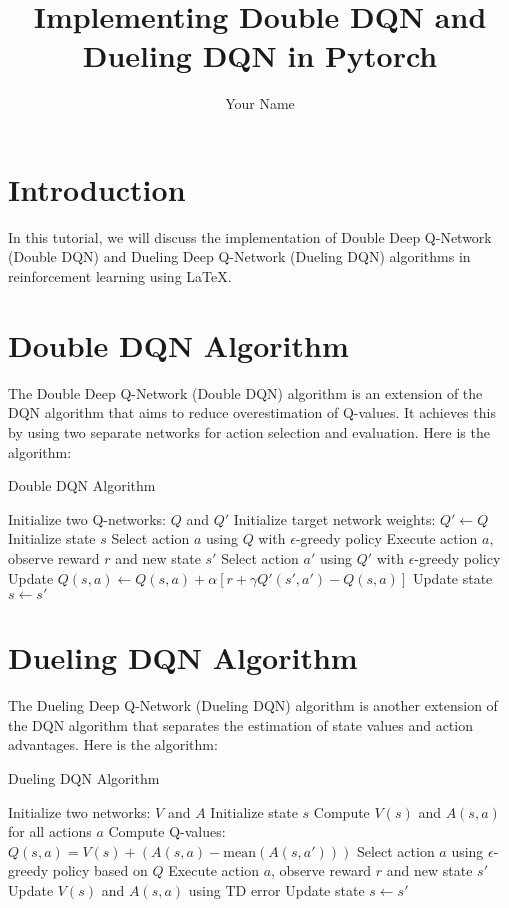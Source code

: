 \documentclass{article}
\title{Implementing Double DQN and Dueling DQN in Pytorch}
\author{Your Name}
\date{}
\begin{document}
\maketitle

\section{Introduction}
In this tutorial, we will discuss the implementation of Double Deep Q-Network (Double DQN) and Dueling Deep Q-Network (Dueling DQN) algorithms in reinforcement learning using LaTeX.

\section{Double DQN Algorithm}
The Double Deep Q-Network (Double DQN) algorithm is an extension of the DQN algorithm that aims to reduce overestimation of Q-values. It achieves this by using two separate networks for action selection and evaluation. Here is the algorithm:

\begin{algorithm}
\caption{Double DQN Algorithm}\label{alg:double_dqn}
\begin{algorithmic}[1]
\State Initialize two Q-networks: $Q$ and $Q'$
\State Initialize target network weights: $Q' \gets Q$
    \State Initialize state $s$
        \State Select action $a$ using $Q$ with $\epsilon$-greedy policy
        \State Execute action $a$, observe reward $r$ and new state $s'$
        \State Select action $a'$ using $Q'$ with $\epsilon$-greedy policy
        \State Update $Q(s, a) \gets Q(s, a) + \alpha[r + \gamma Q'(s', a') - Q(s, a)]$
        \State Update state $s \gets s'$
    \EndFor
\EndFor
\end{algorithmic}
\end{algorithm}

\section{Dueling DQN Algorithm}
The Dueling Deep Q-Network (Dueling DQN) algorithm is another extension of the DQN algorithm that separates the estimation of state values and action advantages. Here is the algorithm:

\begin{algorithm}
\caption{Dueling DQN Algorithm}\label{alg:dueling_dqn}
\begin{algorithmic}[1]
\State Initialize two networks: $V$ and $A$
    \State Initialize state $s$
        \State Compute $V(s)$ and $A(s, a)$ for all actions $a$
        \State Compute Q-values: $Q(s, a) = V(s) + (A(s, a) - \text{mean}(A(s, a')))$
        \State Select action $a$ using $\epsilon$-greedy policy based on $Q$
        \State Execute action $a$, observe reward $r$ and new state $s'$
        \State Update $V(s)$ and $A(s, a)$ using TD error
        \State Update state $s \gets s'$
    \EndFor
\EndFor
\end{algorithmic}
\end{algorithm}
\end{document}
